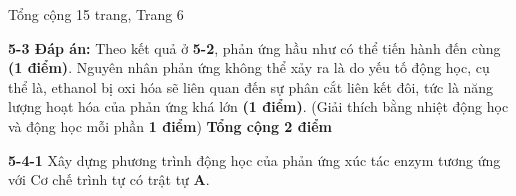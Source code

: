 \vfill
\begin{center}
    \small Tổng cộng 15 trang, Trang 6
\end{center}

\newpage


\noindent{}

\vspace{0.2cm}

\noindent
\textbf{5-3 Đáp án:} Theo kết quả ở \textbf{5-2}, phản ứng hầu như có thể tiến hành đến cùng \textbf{(1 điểm)}. Nguyên nhân phản ứng không thể xảy ra là do yếu tố động học, cụ thể là, ethanol bị oxi hóa sẽ liên quan đến sự phân cắt liên kết đôi, tức là năng lượng hoạt hóa của phản ứng khá lớn \textbf{(1 điểm)}. (Giải thích bằng nhiệt động học và động học mỗi phần \textbf{1 điểm}) \textbf{Tổng cộng 2 điểm}

\vspace{0.2cm}

\noindent
\textbf{5-4-1} Xây dựng phương trình động học của phản ứng xúc tác enzym tương ứng với Cơ chế trình tự có trật tự \textbf{A}.


